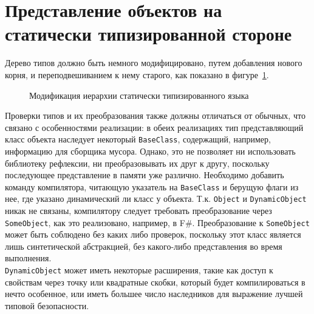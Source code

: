 \documentclass[times,specification,annotation]{itmo-student-thesis}
\begin{document}
\section{Представление объектов на статически типизированной стороне}
Дерево типов должно быть немного модифицировано, путем добавления нового корня, и переподвешиванием к нему старого, как показано в фигуре~\ref{fig:statically-typed-tree}.

\begin{figure}[!h]
	\caption{Модификация иерархии статически типизированного языка}\label{fig:statically-typed-tree}
	\centering
	
\end{figure}
Проверки типов и их преобразования также должны отличаться от обычных, что связано с особенностями реализации: в обеих реализациях тип представляющий класс объекта наследует некоторый \texttt{BaseClass}, содержащий, например, информацию для сборщика мусора. Однако, это не позволяет ни использовать библиотеку рефлексии, ни преобразовывать их друг к другу, поскольку последующее представление в памяти уже различно. Необходимо добавить команду компилятора, читающую указатель на \texttt{BaseClass} и берущую флаги из нее, где указано динамический ли класс у объекта. Т.к. \texttt{Object} и \texttt{DynamicObject} никак не связаны, компилятору следует требовать преобразование через \texttt{SomeObject}, как это реализовано, например, в F\#. Преобразование к \texttt{SomeObject} может быть соблюдено без каких либо проверок, поскольку этот класс является лишь синтетической абстракцией, без какого-либо представления во время выполнения.\\
\texttt{DynamicObject} может иметь некоторые расширения, такие как доступ к свойствам через точку или квадратные скобки, который будет компилироваться в нечто особенное, или иметь большее число наследников для выражение лучшей типовой безопасности.
\end{document}
